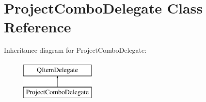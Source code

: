 \hypertarget{classProjectComboDelegate}{\section{Project\+Combo\+Delegate Class Reference}
\label{classProjectComboDelegate}
}
Inheritance diagram for Project\+Combo\+Delegate\+:\begin{figure}[H]
\begin{center}
\leavevmode
\includegraphics[height=2.000000cm]{d4/db0/classProjectComboDelegate}
\end{center}
\end{figure}
